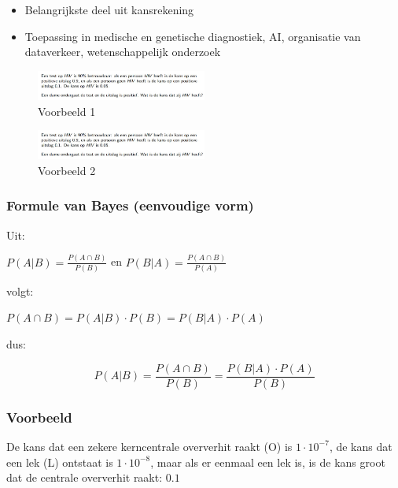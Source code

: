 \documentclass{article}
\begin{document}
\begin{itemize}
    \item Belangrijkste deel uit kansrekening
    \item Toepassing in medische en genetische diagnostiek, AI, organisatie van dataverkeer, wetenschappelijk onderzoek
\end{itemize}

\begin{figure}[H]
    \centering
    \includegraphics[width=0.5\textwidth]{bayes-voorbeeld1.png}
    \caption{Voorbeeld 1}
\end{figure}

\begin{figure}[H]
    \centering
    \includegraphics[width=0.5\textwidth]{bayes-voorbeeld1.png}
    \caption{Voorbeeld 2}
\end{figure}

\subsubsection{Formule van Bayes (eenvoudige vorm)}

Uit:

$P(A | B) = \frac{P(A \cap B)}{P(B)}$ en $P(B | A) = \frac{P(A \cap B)}{P(A)}$

volgt:

\begin{center}
    $P(A \cap B) = P(A | B) \cdot P(B) = P(B | A) \cdot P(A)$
\end{center}

dus:

\begin{equation}
    P(A | B) = \frac{P(A \cap B)}{P(B)} = \frac{P(B | A) \cdot P(A)}{P(B)}
\end{equation}

\subsubsection{Voorbeeld}

De kans dat een zekere kerncentrale oververhit raakt (O) is $1\cdot 10^{-7}$,
de kans dat een lek (L) ontstaat is $1\cdot 10^{-8}$, maar als er eenmaal
een lek is, is de kans groot dat de centrale oververhit raakt: $0.1$
\end{document}
